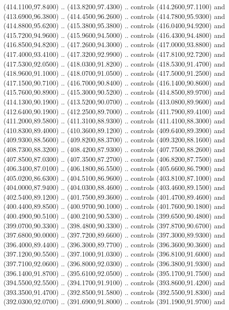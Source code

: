 {\begin{scope}[y=0.80pt, x=0.80pt, yscale=-1, xscale=1, inner sep=0pt, outer sep=0pt, #1]
      (414.1100,97.8400) .. (413.8200,97.4300) .. controls (414.2600,97.1100) and
      (413.6900,96.3800) .. (414.4500,96.2600) .. controls (414.7800,95.9300) and
      (414.8800,95.6200) .. (415.3800,95.3800) .. controls (416.0400,94.9200) and
      (415.7200,94.9600) .. (415.9600,94.5000) .. controls (416.4300,94.4800) and
      (416.8500,94.8200) .. (417.2600,94.3000) .. controls (417.0000,93.8800) and
      (417.4000,93.4100) .. (417.3200,92.9900) .. controls (417.8100,92.7200) and
      (417.5300,92.0500) .. (418.0300,91.8200) .. controls (418.5300,91.4700) and
      (418.9600,91.1000) .. (418.0700,91.0500) .. controls (417.5000,91.2500) and
      (417.1500,90.7100) .. (416.7000,90.8400) .. controls (416.1400,90.8600) and
      (415.7600,90.8900) .. (415.3000,90.5200) .. controls (414.8500,89.9700) and
      (414.1300,90.1900) .. (413.5200,90.0700) .. controls (413.0800,89.9600) and
      (412.6400,90.1900) .. (412.2500,89.7000) .. controls (411.7900,89.4100) and
      (411.2000,89.5800) .. (411.3100,88.9300) .. controls (411.4100,88.3000) and
      (410.8300,89.4000) .. (410.3600,89.1200) .. controls (409.6400,89.3900) and
      (409.9300,88.5600) .. (409.8200,88.3700) .. controls (409.3200,88.1600) and
      (408.7300,88.3200) .. (408.4200,87.9300) .. controls (407.7500,88.2600) and
      (407.8500,87.0300) .. (407.3500,87.2700) .. controls (406.8200,87.7500) and
      (406.3400,87.0100) .. (406.1800,86.5500) .. controls (405.6600,86.7900) and
      (405.0200,86.6300) .. (404.5100,86.9600) .. controls (403.8100,87.1000) and
      (404.0000,87.9400) .. (404.0300,88.4600) .. controls (403.4600,89.1500) and
      (402.5400,89.1200) .. (401.7500,89.3600) .. controls (401.4700,89.4600) and
      (400.4400,89.8500) .. (400.9700,90.1000) .. controls (401.7600,90.1800) and
      (400.4900,90.5100) .. (400.2100,90.5300) .. controls (399.6500,90.4800) and
      (399.0700,90.3300) .. (398.4800,90.3300) .. controls (397.8700,90.6700) and
      (397.6800,90.0000) .. (397.7200,89.6600) .. controls (397.3000,89.9300) and
      (396.4000,89.4400) .. (396.3000,89.7700) .. controls (396.3600,90.3600) and
      (397.1200,90.5500) .. (397.1000,91.0300) .. controls (396.8100,91.6000) and
      (397.7100,92.0600) .. (396.8000,92.0300) .. controls (396.3800,91.9300) and
      (396.1400,91.8700) .. (395.6100,92.0500) .. controls (395.1700,91.7500) and
      (394.5500,92.5500) .. (394.1700,91.9100) .. controls (393.8600,91.4200) and
      (393.3500,91.4700) .. (392.8500,91.5800) .. controls (392.5500,91.8300) and
      (392.0300,92.0700) .. (391.6900,91.8000) .. controls (391.1900,91.9700) and

\end{scope}}
